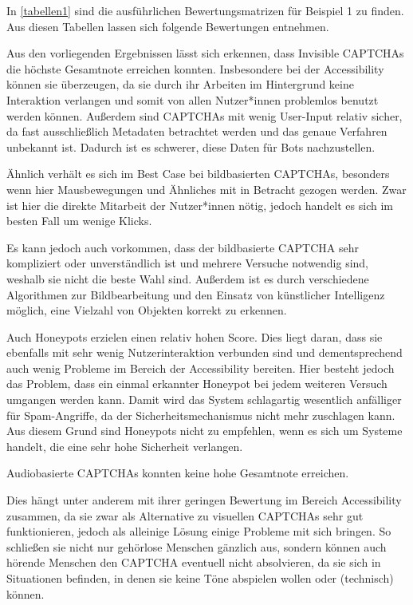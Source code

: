 In \autoref{tabellen1} sind die ausführlichen Bewertungsmatrizen für Beispiel 1 zu finden. 
Aus diesen Tabellen lassen sich folgende Bewertungen entnehmen.

Aus den vorliegenden Ergebnissen lässt sich erkennen, dass Invisible \linebreak CAPTCHAs die höchste Gesamtnote erreichen konnten.
Insbesondere bei der Accessibility können sie überzeugen, 
da sie durch ihr Arbeiten im Hintergrund keine Interaktion verlangen und somit von allen Nutzer*innen problemlos benutzt werden können.
Außerdem sind CAPTCHAs mit wenig User-Input relativ sicher, da fast ausschließlich Metadaten betrachtet werden und das genaue Verfahren unbekannt ist.
Dadurch ist es schwerer, diese Daten für Bots nachzustellen.

Ähnlich verhält es sich im Best Case bei bildbasierten CAPTCHAs, besonders wenn hier Mausbewegungen und Ähnliches mit in Betracht gezogen werden.
Zwar ist hier die direkte Mitarbeit der Nutzer*innen nötig, jedoch handelt es sich im besten Fall um wenige Klicks. 

Es kann jedoch auch vorkommen, dass der bildbasierte CAPTCHA sehr kompliziert oder unverständlich ist und mehrere Versuche notwendig sind,
weshalb sie nicht die beste Wahl sind.
Außerdem ist es durch verschiedene Algorithmen zur Bildbearbeitung und den Einsatz von künstlicher Intelligenz möglich,
eine Vielzahl von Objekten korrekt zu erkennen.

Auch Honeypots erzielen einen relativ hohen Score.
Dies liegt daran, dass sie ebenfalls mit sehr wenig Nutzerinteraktion verbunden sind
und dementsprechend auch wenig Probleme im Bereich der Accessibility bereiten.
Hier besteht jedoch das Problem, dass ein einmal erkannter Honeypot bei jedem weiteren Versuch umgangen werden kann.
Damit wird das System schlagartig wesentlich anfälliger für Spam-Angriffe, da der Sicherheitsmechanismus nicht mehr zuschlagen kann.
Aus diesem Grund sind Honeypots nicht zu empfehlen, wenn es sich um Systeme handelt, die eine sehr hohe Sicherheit verlangen.

Audiobasierte CAPTCHAs konnten keine hohe Gesamtnote erreichen.

Dies hängt unter anderem mit ihrer geringen Bewertung im Bereich Accessibility zusammen,
da sie zwar als Alternative zu visuellen CAPTCHAs sehr gut funktionieren, jedoch als alleinige Lösung einige Probleme mit sich bringen.
So schließen sie nicht nur gehörlose Menschen gänzlich aus, sondern können auch hörende Menschen den CAPTCHA eventuell nicht absolvieren,
da sie sich in Situationen befinden, in denen sie keine Töne abspielen wollen oder (technisch) können.

